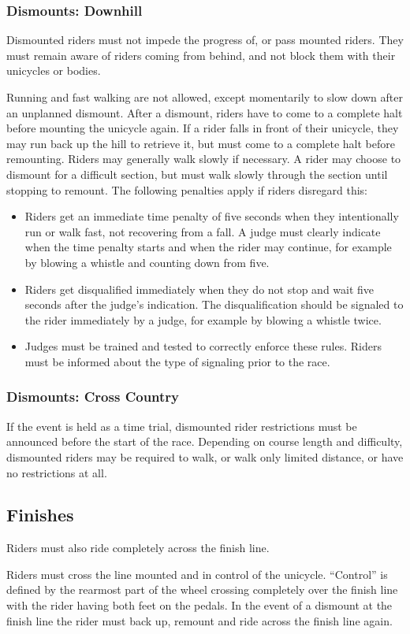 \subsubsection{Dismounts: Downhill}

Dismounted riders must not impede the progress of, or pass mounted riders.
They must remain aware of riders coming from behind, and not block them with their
unicycles or bodies.

Running and fast walking are not allowed, except momentarily to slow down after an unplanned dismount.
After a dismount, riders have to come to a complete halt before mounting the unicycle again.
If a rider falls in front of their unicycle, they may run back up the hill to retrieve it, but must come to a complete halt before remounting.
Riders may generally walk slowly if necessary.
A rider may choose to dismount for a difficult section, but must walk slowly through the section until stopping to remount.
The following penalties apply if riders disregard this:
\begin{itemize}
\item Riders get an immediate time penalty of five seconds when they intentionally run or walk fast, not recovering from a fall.
A judge must clearly indicate when the time penalty starts and when the rider may continue, for example by blowing a whistle and counting down from five.
\item Riders get disqualified immediately when they do not stop and wait five seconds after the judge's indication.
The disqualification should be signaled to the rider immediately by a judge, for example by blowing a whistle twice.
\item Judges must be trained and tested to correctly enforce these rules.
Riders must be informed about the type of signaling prior to the race.
\end{itemize}

\subsubsection{Dismounts: Cross Country}

If the event is held as a time trial, dismounted rider restrictions must be announced before the start of the race.
Depending on course length and difficulty, dismounted riders may be required to walk, or walk only limited distance, or have no restrictions at all.

\subsection{Finishes}

Riders must also ride completely across the finish line.

Riders must cross the line mounted and in control of the unicycle.
``Control'' is defined by the rearmost part of the wheel crossing completely over the finish line with the rider having both feet on the pedals.
In the event of a dismount at the finish line the rider must back up, remount and ride across the finish line again.
